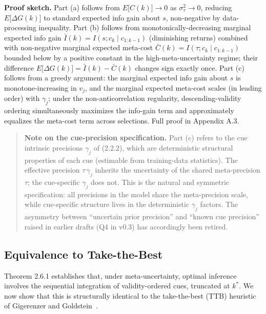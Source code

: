 \documentclass{article}
\begin{document}
\textbf{Proof sketch.} Part (a) follows from
\(E\lbrack C(k)\rbrack \rightarrow 0\) as
\(\sigma_{\tau}^{2} \rightarrow 0\), reducing
\(E\lbrack\Delta G(k)\rbrack\) to standard expected info gain about
\(s\), non-negative by data-processing inequality. Part (b) follows from
monotonically-decreasing marginal expected info gain
\(\bar{I}(k) = I(s;c_{k} \mid c_{1:k - 1})\) (diminishing returns)
combined with non-negative marginal expected meta-cost
\(\bar{C}(k) = I(\tau;c_{k} \mid c_{1:k - 1})\) bounded below by a
positive constant in the high-meta-uncertainty regime; their difference
\(E\lbrack\Delta G(k)\rbrack = \bar{I}(k) - \bar{C}(k)\) changes sign
exactly once. Part (c) follows from a greedy argument: the marginal
expected info gain about \(s\) is monotone-increasing in \(v_{j}\), and
the marginal expected meta-cost scales (in leading order) with
\(\gamma_{j}\); under the non-anticorrelation regularity,
descending-validity ordering simultaneously maximizes the info-gain term
and approximately equalizes the meta-cost term across selections. Full
proof in Appendix A.3.

\begin{quote}
\textbf{Note on the cue-precision specification.} Part (c) refers to the
cue intrinsic precisions \(\gamma_{j}\) of (2.2.2), which are
deterministic structural properties of each cue (estimable from
training-data statistics). The effective precision \(\tau\,\gamma_{j}\)
inherits the uncertainty of the shared meta-precision \(\tau\); the
cue-specific \(\gamma_{j}\) does not. This is the natural and symmetric
specification: all precisions in the model share the meta-precision
scale, while cue-specific structure lives in the deterministic
\(\gamma_{j}\) factors. The asymmetry between ``uncertain prior
precision'' and ``known cue precision'' raised in earlier drafts (Q4 in
v0.3) has accordingly been retired.
\end{quote}

\subsection{Equivalence to
Take-the-Best}\label{equivalence-to-take-the-best}

Theorem 2.6.1 establishes that, under meta-uncertainty, optimal
inference involves the sequential integration of validity-ordered cues,
truncated at \(k^{*}\). We now show that this is structurally identical
to the take-the-best (TTB) heuristic of Gigerenzer and Goldstein~\cite{gigerenzer1996}.
\end{document}
